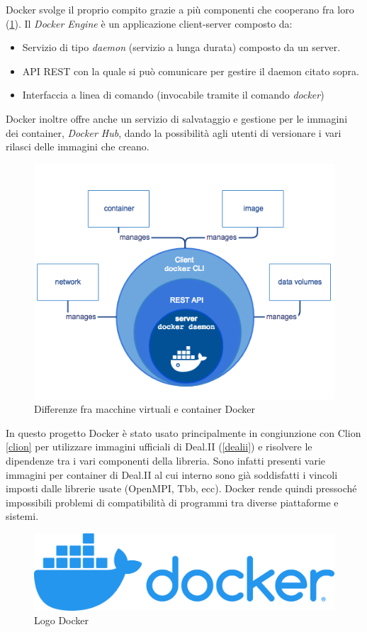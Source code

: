     Docker svolge il proprio compito grazie a più componenti che cooperano fra loro (\ref*{docker-components}).
    Il \textit{Docker Engine} è un applicazione client-server composto da:
    \begin{itemize}
        \item Servizio di tipo \textit{daemon} (servizio a lunga durata) composto da un server.
        \item API REST con la quale si può comunicare per gestire il daemon citato sopra.
        \item Interfaccia a linea di comando (invocabile tramite il comando \textit{docker})
    \end{itemize}

    Docker inoltre offre anche un servizio di salvataggio e gestione per le immagini dei container,
    \textit{Docker Hub}, dando la possibilità agli utenti di versionare i vari rilasci delle immagini
    che creano.
    \begin{figure}[H]\label{docker-components}
        \centering
        \includegraphics[width=\linewidth]{figure/engine-components-flow.png}
        \caption{Differenze fra macchine virtuali e container Docker}
    \end{figure}
    In questo progetto Docker è stato usato principalmente in congiunzione con Clion \ref*{clion}
    per utilizzare immagini ufficiali di Deal.II (\ref*{dealii}) e risolvere le dipendenze tra i vari componenti
    della libreria. Sono infatti presenti varie immagini per container di Deal.II
    al cui interno sono già soddisfatti i vincoli imposti dalle librerie usate (OpenMPI, Tbb, ecc).
    Docker rende quindi pressoché impossibili problemi di compatibilità di programmi tra diverse piattaforme e sistemi. 
    \begin{figure}[H]
        \centering
        \includegraphics[width=\linewidth]{figure/docker.png}
        \caption{Logo Docker}
    \end{figure}


